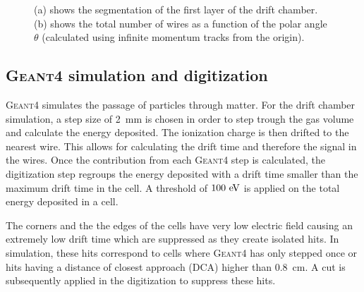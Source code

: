 \documentclass{article}
\begin{document}
\begin{figure}[!h]
\centering
{}
\hfil
{}
\caption{(a) shows the segmentation of the first layer of the drift chamber. (b) shows the total number of wires as a function of the polar angle $\theta$ (calculated using infinite momentum tracks from the origin).}
\label{fig_segmentation}
\end{figure}


\subsection{\textsc{Geant4} simulation and digitization}
\textsc{Geant4} simulates the passage of particles through matter. For the drift chamber simulation, a step size of 2~mm is chosen in order to step trough the gas volume and calculate the energy deposited. The ionization charge is then drifted to the nearest wire. This allows for calculating the drift time and therefore the signal in the wires. Once the contribution from each \textsc{Geant4} step is calculated, the digitization step regroups the energy deposited with a drift time smaller than the maximum drift time in the cell. A threshold of $100\,\mathrm{\,e\kern -0.1em V}$ is applied on the total energy deposited in a cell.

The corners and the the edges of the cells have very low electric field causing an extremely low drift time which are suppressed as they create isolated hits. In simulation, these hits correspond to cells where \textsc{Geant4} has only stepped once or hits having a distance of closest approach (DCA) higher than 0.8~cm. A cut is subsequently applied in the digitization to suppress these hits.
\end{document}
